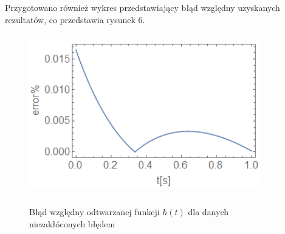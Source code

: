 \documentclass[twoside]{projektInzynierskiMS1}
\newcounter{rowcnt}
\newcommand\rownum{\ifnumequal{\value{rowcnt}}{0}{\textbf{Nr.}}{\therowcnt.}\refstepcounter{rowcnt}}
\begin{document}
Przygotowano również wykres przedstawiający błąd względny uzyskanych rezultatów, co przedstawia rysunek 6. \\

\begin{figure}[H]
\begin{center}
		\includegraphics[height=7cm, width=10cm]{pics/0abs.png}\\
	\caption{Błąd względny odtwarzanej funkcji $h(t)$ dla danych niezakłóconych błędem}
\end{center}
\end{figure}



\end{document}
